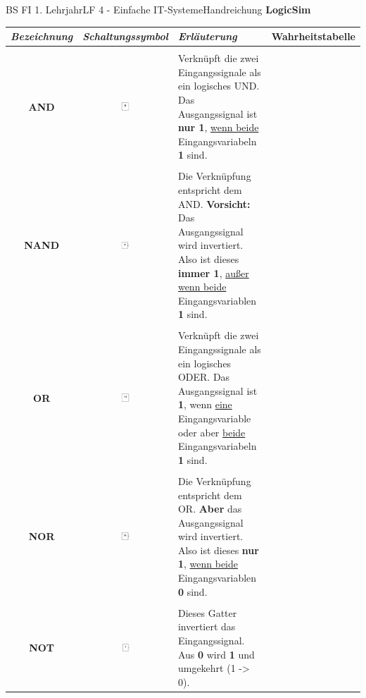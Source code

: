 \documentclass[11pt,oneside,openany,headings=optiontotoc,11pt,numbers=noenddot]{article}
\begin{document}
\begin{worksheet}{BS FI 1. Lehrjahr}{LF 4 - Einfache IT-Systeme}{Handreichung \textbf{LogicSim}}
\begin{tabularx}{\textwidth}{c|c|X|c}
			\textit{Bezeichnung} & \textit{Schaltungssymbol} & \textit{Erläuterung} & Wahrheitstabelle\\
			\hline
			\hline
			& & & \\
			\textbf{AND} & \includegraphics[width=0.1\textwidth, align=t]{../99_Bilder/AND.jpg} & Verknüpft die zwei Eingangssignale als ein logisches UND. Das Ausgangssignal ist \textbf{nur 1}, \underline{wenn beide} Eingangsvariabeln \textbf{1} sind. & \\
			\hline
			& & & \\
			\textbf{NAND} & \includegraphics[width=0.1\textwidth,align=t]{../99_Bilder/NAND.jpg} & Die Verknüpfung entspricht dem AND. \textbf{Vorsicht:} Das Ausgangssignal wird invertiert. Also ist dieses \textbf{immer 1}, \underline{außer wenn beide} Eingangsvariablen \textbf{1} sind. & \\
			\hline
			& & & \\
			\textbf{OR} & \includegraphics[width=0.1\textwidth, align=t]{../99_Bilder/OR.jpg} & Verknüpft die zwei Eingangssignale als ein logisches ODER. Das Ausgangssignal ist \textbf{1}, wenn \underline{eine} Eingangsvariable oder aber \underline{beide} Eingangsvariabeln \textbf{1} sind. & \\
			\hline
			& & & \\
			\textbf{NOR} & \includegraphics[width=0.1\textwidth,align=t]{../99_Bilder/NOR.jpg} & Die Verknüpfung entspricht dem OR. \textbf{Aber} das Ausgangssignal wird invertiert. Also ist dieses  \textbf{nur 1}, \underline{wenn beide} Eingangsvariablen \textbf{0} sind. & \\
			\hline
			& & & \\
			\textbf{NOT} & \includegraphics[width=0.1\textwidth, align=t]{../99_Bilder/NOT.jpg} & Dieses Gatter invertiert das Eingangssignal. Aus \textbf{0} wird \textbf{1} und umgekehrt (1 -> 0). & \\

\end{tabularx}
\end{worksheet}
\end{document}
